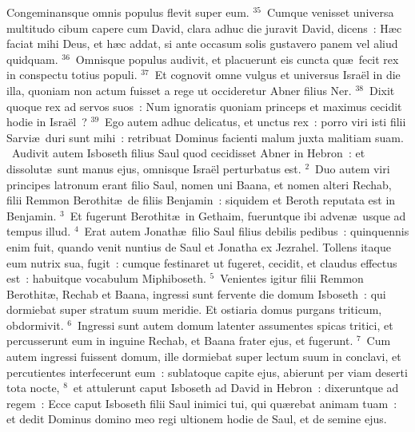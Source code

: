  Congeminansque omnis populus flevit super eum.
${}^{35}$~Cumque venisset universa multitudo cibum capere cum David, clara adhuc die juravit David, dicens~: H\ae c faciat mihi Deus, et h\ae c addat, si ante occasum solis gustavero panem vel aliud quidquam.
${}^{36}$~Omnisque populus audivit, et placuerunt eis cuncta qu\ae\ fecit rex in conspectu totius populi.
${}^{37}$~Et cognovit omne vulgus et universus Isra\"el in die illa, quoniam non actum fuisset a rege ut occideretur Abner filius Ner.
${}^{38}$~Dixit quoque rex ad servos suos~: Num ignoratis quoniam princeps et maximus cecidit hodie in Isra\"el~?
${}^{39}$~Ego autem adhuc delicatus, et unctus rex~: porro viri isti filii Sarvi\ae\ duri sunt mihi~: retribuat Dominus facienti malum juxta malitiam suam.
~Audivit autem Isboseth filius Saul quod cecidisset Abner in Hebron~: et dissolut\ae\ sunt manus ejus, omnisque Isra\"el perturbatus est.
${}^{2}$~Duo autem viri principes latronum erant filio Saul, nomen uni Baana, et nomen alteri Rechab, filii Remmon Berothit\ae\ de filiis Benjamin~: siquidem et Beroth reputata est in Benjamin.
${}^{3}$~Et fugerunt Berothit\ae\ in Gethaim, fueruntque ibi adven\ae\ usque ad tempus illud.
${}^{4}$~Erat autem Jonath\ae\ filio Saul filius debilis pedibus~: quinquennis enim fuit, quando venit nuntius de Saul et Jonatha ex Jezrahel. Tollens itaque eum nutrix sua, fugit~: cumque festinaret ut fugeret, cecidit, et claudus effectus est~: habuitque vocabulum Miphiboseth.
${}^{5}$~Venientes igitur filii Remmon Berothit\ae , Rechab et Baana, ingressi sunt fervente die domum Isboseth~: qui dormiebat super stratum suum meridie. Et ostiaria domus purgans triticum, obdormivit.
${}^{6}$~Ingressi sunt autem domum latenter assumentes spicas tritici, et percusserunt eum in inguine Rechab, et Baana frater ejus, et fugerunt.
${}^{7}$~Cum autem ingressi fuissent domum, ille dormiebat super lectum suum in conclavi, et percutientes interfecerunt eum~: sublatoque capite ejus, abierunt per viam deserti tota nocte,
${}^{8}$~et attulerunt caput Isboseth ad David in Hebron~: dixeruntque ad regem~: Ecce caput Isboseth filii Saul inimici tui, qui qu\ae rebat animam tuam~: et dedit Dominus domino meo regi ultionem hodie de Saul, et de semine ejus.


